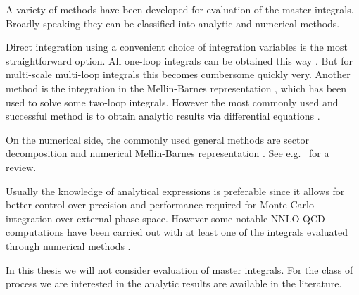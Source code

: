 
A variety of methods have been developed for evaluation of the master integrals.
Broadly speaking they can be classified into analytic and numerical methods.

Direct integration using a convenient choice of integration variables is the most straightforward option.
All one-loop integrals can be obtained this way \cite{vanHameren:2010cp,Ellis:2007qk,tHooft:1978jhc,Denner:2010tr}.
But for multi-scale multi-loop integrals this becomes  cumbersome quickly  very.
Another method is the integration in the Mellin-Barnes  representation  \cite{Smirnov:1999gc,Tausk:1999vh,Dubovyk:2017cqw}, which
has been used to solve some two-loop integrals.
However the most commonly used and successful method is to obtain analytic results via
differential equations \cite{Kotikov:1990kg,Remiddi:1997ny,Gehrmann:1999as,Henn:2013pwa,Argeri:2007up,Henn:2014qga}.

On the numerical side, the commonly used general methods are sector decomposition \cite{Binoth:2000ps,Binoth:2003ak}
and numerical Mellin-Barnes representation \cite{Czakon:2005rk,Anastasiou:2005cb}.
See e.g.\ \cite{Freitas:2016sty} for a review.

Usually the knowledge of analytical expressions is preferable since it allows for better control over
precision and performance required for Monte-Carlo integration over external phase space. However
some notable NNLO QCD computations have been carried out with at least one of the integrals evaluated through numerical
methods .

In this thesis we will not consider evaluation of master integrals.
For the class of process we are interested in the analytic results are available in the literature.
